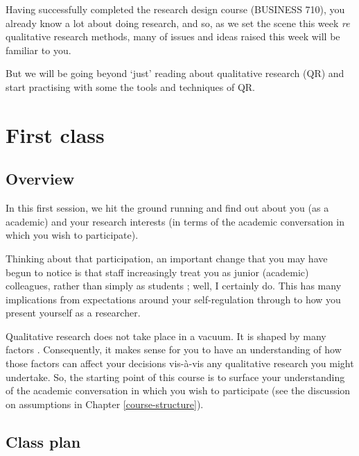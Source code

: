 \documentclass[]{book}
\theoremstyle{definition}
\theoremstyle{definition}
\theoremstyle{definition}
\theoremstyle{remark}
\begin{document}
Having successfully completed the research design course (BUSINESS 710),
you already know a lot about doing research, and so, as we set the scene
this week \emph{re} qualitative research methods, many of issues and
ideas raised this week will be familiar to you.

But we will be going beyond `just' reading about qualitative research
(QR) and start practising with some the tools and techniques of QR.

\hypertarget{first-class}{%
\section*{First class}\label{first-class}}

\hypertarget{overview}{%
\subsection*{Overview}\label{overview}}

In this first session, we hit the ground running and find out about you
(as a academic) and your research interests (in terms of the academic
conversation in which you wish to participate).

Thinking about that participation, an important change that you may have
begun to notice is that staff increasingly treat you as junior
(academic) colleagues, rather than simply as students
\autocite{breuer_2007_issueslearningteaching}; well, I certainly do.
This has many implications from expectations around your self-regulation
\autocite{schunk_2005_selfregulatedlearningeducational} through to how
you present yourself as a researcher.

Qualitative research does not take place in a vacuum. It is shaped by
many factors \autocite[e.g.,][
p.86]{huff_2009_designingresearchpublication}. Consequently, it makes
sense for you to have an understanding of how those factors can affect
your decisions vis-à-vis any qualitative research you might undertake.
So, the starting point of this course is to surface your understanding
of the academic conversation in which you wish to participate (see the
discussion on assumptions in Chapter \ref{course-structure}).

\hypertarget{class-plan}{%
\subsection*{Class plan}\label{class-plan}}
\end{document}
